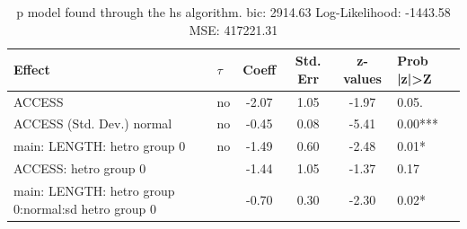 \begin{table}
	\caption{p model found through the hs algorithm. bic: 2914.63 Log-Likelihood: -1443.58 MSE: 417221.31}
	\begin{center}
		\begin{tabular}{|l|l|c|c|c|l|}
			\hline
			Effect & $\tau$ & Coeff & Std. Err & z-values & Prob |z|>Z \\
			\hline
			ACCESS & no & -2.07 & 1.05 & -1.97 & 0.05. \\
			\hline
			ACCESS (Std. Dev.) normal & no & -0.45 & 0.08 & -5.41 & 0.00*** \\
			\hline
			main: LENGTH: hetro group 0 & no & -1.49 & 0.60 & -2.48 & 0.01* \\
			\hline
			ACCESS: hetro group 0 &  & -1.44 & 1.05 & -1.37 & 0.17 \\
			\hline
			main: LENGTH: hetro group 0:normal:sd  hetro group 0 &  & -0.70 & 0.30 & -2.30 & 0.02* \\
			\hline
		\end{tabular}
	\end{center}
\end{table}